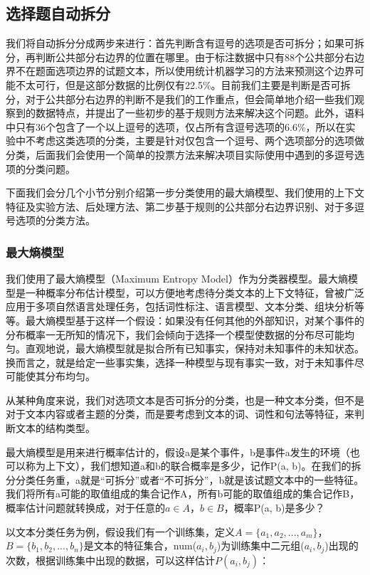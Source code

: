 \documentclass[master, winfont]{njuthesis}
\begin{document}
\subsection{选择题自动拆分}
我们将自动拆分分成两步来进行：首先判断含有逗号的选项是否可拆分；如果可拆分，再判断公共部分右边界的位置在哪里。由于标注数据中只有88个公共部分右边界不在题面选项边界的试题文本，所以使用统计机器学习的方法来预测这个边界可能不太可行，但是这部分数据的比例仅有22.5\%。目前我们主要是判断是否可拆分，对于公共部分右边界的判断不是我们的工作重点，但会简单地介绍一些我们观察到的数据特点，并提出了一些初步的基于规则方法来解决这个问题。此外，语料中只有36个包含了一个以上逗号的选项，仅占所有含逗号选项的6.6\%，所以在实验中不考虑这类选项的分类，主要是针对仅包含一个逗号、两个选项部分的选项做分类，后面我们会使用一个简单的投票方法来解决项目实际使用中遇到的多逗号选项的分类问题。

下面我们会分几个小节分别介绍第一步分类使用的最大熵模型、我们使用的上下文特征及实验方法、后处理方法、第二步基于规则的公共部分右边界识别、对于多逗号选项的分类方法。

\subsubsection{最大熵模型}
我们使用了最大熵模型（Maximum Entropy Model）\cite{MaxEnt1996}作为分类器模型。最大熵模型是一种概率分布估计模型，可以方便地考虑待分类文本的上下文特征，曾被广泛应用于多项自然语言处理任务，包括词性标注\cite{Ratnaparkhi1996A}、语言模型\cite{Lau1993Adaptive}、文本分类\cite{Nigam1999Using}\cite{TextMaxEnt2005}、组块分析\cite{ChunkMaxEnt2003}等等。最大熵模型基于这样一个假设：如果没有任何其他的外部知识，对某个事件的分布概率一无所知的情况下，我们会倾向于选择一个模型使数据的分布尽可能均匀。直观地说，最大熵模型就是拟合所有已知事实，保持对未知事件的未知状态。换而言之，就是给定一些事实集，选择一种模型与现有事实一致，对于未知事件尽可能使其分布均匀。

从某种角度来说，我们对选项文本是否可拆分的分类，也是一种文本分类，但不是对于文本内容或者主题的分类，而是要考虑到文本的词、词性和句法等特征，来判断文本的结构类型。

最大熵模型是用来进行概率估计的，假设a是某个事件，b是事件a发生的环境（也可以称为上下文），我们想知道a和b的联合概率是多少，记作P(a, b)。在我们的拆分分类任务重，a就是“可拆分”或者“不可拆分”，b就是该试题文本中的一些特征。我们将所有a可能的取值组成的集合记作A，所有b可能的取值组成的集合记作B，概率估计问题就转换成，对于任意的$a \in A$，$b \in B$，概率P(a, b)是多少？

以文本分类任务为例，假设我们有一个训练集，定义$A = \{a_1,a_2, ..., a_m\}$，$B = \{b_1, b_2, ..., b_n\}$是文本的特征集合，num($a_i, b_j$)为训练集中二元组($a_i, b_j$)出现的次数，根据训练集中出现的数据，可以这样估计$P(a_i, b_j)$：
\end{document}
